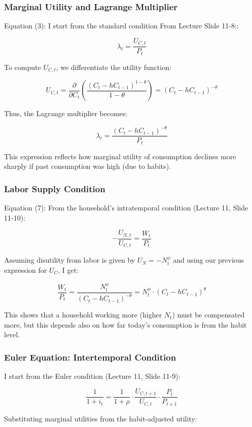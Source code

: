 \documentclass[12pt,a4paper,notitlepage]{article}
\numberwithin{equation}{section}
\begin{document}
\begin{itemize}
\begin{itemize}
\subsubsection{   Marginal Utility and Lagrange Multiplier}


Equation (3): I start from the standard condition From Lecture Slide 11-8::

\[
\lambda_t = \frac{U_{C,t}}{P_t}
\]

To compute $U_{C,t}$, we differentiate the utility function:

\[
U_{C,t} = \frac{\partial}{\partial C_t} \left( \frac{(C_t - h C_{t-1})^{1 - \theta}}{1 - \theta} \right)
= (C_t - h C_{t-1})^{-\theta}
\]

Thus, the Lagrange multiplier becomes:

\[
\lambda_t = \frac{(C_t - h C_{t-1})^{-\theta}}{P_t}
\]

This expression reflects how marginal utility of consumption declines more sharply if past consumption was high (due to habits).

\subsubsection{   Labor Supply Condition}


Equation (7): From the household's intratemporal condition (Lecture 11, Slide 11-10):

\[
- \frac{U_{N,t}}{U_{C,t}} = \frac{W_t}{P_t}
\]

Assuming disutility from labor is given by $U_N = -N_t^{\phi}$ and using our previous expression for $U_C$, I get:

\[
\frac{W_t}{P_t} = \frac{N_t^\phi}{(C_t - h C_{t-1})^{-\theta}} = N_t^\phi \cdot (C_t - h C_{t-1})^\theta
\]

This shows that a household working more (higher $N_t$) must be compensated more, but this depends also on how far today's consumption is from the habit level.

\subsubsection{   Euler Equation: Intertemporal Condition}


I start from the Euler condition (Lecture 11, Slide 11-9):

\[
\frac{1}{1 + i_t} = \frac{1}{1 + \rho} \cdot \frac{U_{C,t+1}}{U_{C,t}} \cdot \frac{P_t}{P_{t+1}}
\]

Substituting marginal utilities from the habit-adjusted utility:


\end{itemize}
\end{itemize}
\end{document}
